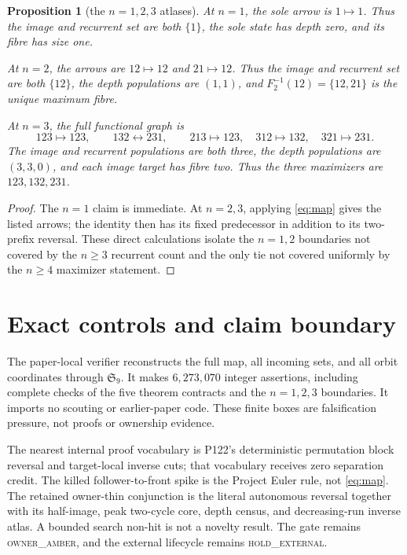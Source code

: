 \documentclass[a4paper,10pt]{amsart}
\newtheorem{proposition}[theorem]{Proposition}
\theoremstyle{remark}
\begin{document}
\begin{proposition}[the $n=1,2,3$ atlases]\label{prop:small}
At $n=1$, the sole arrow is $1\mapsto1$.  Thus the image and recurrent set
are both $\{1\}$, the sole state has depth zero, and its fibre has size one.

At $n=2$, the arrows are $12\mapsto12$ and $21\mapsto12$.  Thus the image
and recurrent set are both $\{12\}$, the depth populations are $(1,1)$, and
$F_2^{-1}(12)=\{12,21\}$ is the unique maximum fibre.

At $n=3$, the full functional graph is
\begin{equation}\label{eq:n3-atlas}
 123\mapsto123,\qquad 132\leftrightarrow231,
 \qquad 213\mapsto123,\quad312\mapsto132,\quad321\mapsto231.
\end{equation}
The image and recurrent populations are both three, the depth populations
are $(3,3,0)$, and each image target has fibre two.  Thus the three
maximizers are $123,132,231$.
\end{proposition}

\begin{proof}
The $n=1$ claim is immediate.  At $n=2,3$, applying \eqref{eq:map} gives the
listed arrows; the identity then has its fixed predecessor in addition to
its two-prefix reversal.  These direct calculations isolate the $n=1,2$
boundaries not covered by the $n\ge3$ recurrent count and the only tie not
covered uniformly by the $n\ge4$ maximizer statement.
\end{proof}

\section{Exact controls and claim boundary}

The paper-local verifier reconstructs the full map, all incoming sets, and
all orbit coordinates through $\mathfrak S_9$.  It makes $6{,}273{,}070$
integer assertions, including complete checks of the five theorem contracts
and the $n=1,2,3$ boundaries.  It imports no scouting or earlier-paper code.
These finite boxes are falsification pressure, not proofs or ownership
evidence.

The nearest internal proof vocabulary is P122's deterministic permutation
block reversal and target-local inverse cuts; that vocabulary receives zero
separation credit.  The killed follower-to-front spike is the Project Euler
rule, not \eqref{eq:map}.  The retained owner-thin conjunction is the literal
autonomous reversal together with its half-image, peak two-cycle core, depth
census, and decreasing-run inverse atlas.  A bounded search non-hit is not a
novelty result.  The gate remains \textsc{owner\_amber}, and the external
lifecycle remains \textsc{hold\_external}.



\end{document}
